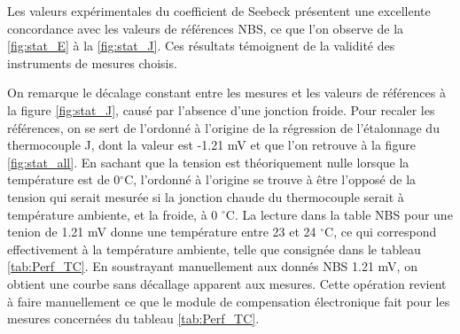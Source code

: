 \documentclass[11pt,twoside]{article}
\numberwithin{figure}{section}
\begin{document}
Les valeurs expérimentales du coefficient de Seebeck présentent une excellente concordance avec les valeurs de références NBS, ce que l'on observe de la \ref{fig:stat_E} à la \ref{fig:stat_J}. Ces résultats témoignent de la validité des instruments de mesures choisis.

On remarque le décalage constant entre les mesures et les valeurs de références à la figure \ref{fig:stat_J}, causé par l'absence d'une jonction froide. Pour recaler les références, on se sert de l'ordonné à l'origine de la régression de l'étalonnage du thermocouple J, dont la valeur est -1.21 mV et que l'on retrouve à la figure \ref{fig:stat_all}. En sachant que la tension est théoriquement nulle lorsque la température est de 0\(^\circ\)C, l'ordonné à l'origine se trouve à être l'opposé de la tension qui serait mesurée si la jonction chaude du thermocouple serait à température ambiente, et la froide, à 0 \(^\circ\)C. La lecture dans la table NBS pour une tenion de 1.21 mV donne une température entre 23 et 24 \(^\circ\)C, ce qui correspond effectivement à la température ambiente, telle que consignée dans le tableau \ref{tab:Perf_TC}. En soustrayant manuellement aux donnés NBS 1.21 mV, on obtient une courbe sans décallage apparent aux mesures. Cette opération revient à faire manuellement ce que le module de compensation électronique fait pour les mesures concernées du tableau \ref{tab:Perf_TC}.   


\newpage
\thispagestyle{empty}
\end{document}
